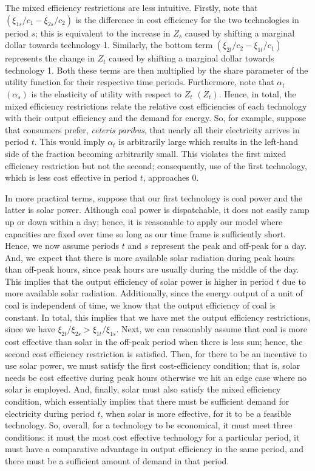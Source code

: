 \documentclass[11pt,a4paper,leqno]{extarticle}
\begin{document}
	The mixed efficiency restrictions are less intuitive. Firstly, note that $\left(\xi_{1s}/c_1 - \xi_{2s}/c_2\right)$ is the difference in cost efficiency for the two technologies in period $s$; this is equivalent to the increase in $Z_s$ caused by shifting a marginal dollar towards technology 1. Similarly, the bottom term $\left( \xi_{2t}/c_2 - \xi_{1t}/c_1 \right)$ represents the change in $Z_t$ caused by shifting a marginal dollar towards technology 1. Both these terms are then multiplied by the share parameter of the utility function for their respective time periods. Furthermore, note that $\alpha_t$ $(\alpha_s)$ is the elasticity of utility with respect to $Z_t$ $(Z_t)$. Hence, in total, the mixed efficiency restrictions relate the relative cost efficiencies of each technology with their output efficiency and the demand for energy. So, for example, suppose that consumers prefer, \textit{ceteris paribus}, that nearly all their electricity arrives in period $t$. This would imply $\alpha_t$ is arbitrarily large which results in the left-hand side of the fraction becoming arbitrarily small. This violates the first mixed efficiency restriction but not the second; consequently, use of the first technology, which is less cost effective in period $t$, approaches $0$. 
	
	
	
	In more practical terms, suppose that our first technology is coal power and the latter is solar power. Although coal power is dispatchable, it does not easily ramp up or down within a day; hence, it is reasonable to apply our model where capacities are fixed over time so long as our time frame is sufficiently short. Hence, we now assume periods $t$ and $s$ represent the peak and off-peak for a day. And, we expect that there is more available solar radiation during peak hours than off-peak hours, since peak hours are usually during the middle of the day. This implies that the output efficiency of solar power is higher in period $t$ due to more available solar radiation. Additionally, since the energy output of a unit of coal is independent of time, we know that the output efficiency of coal is constant. In total, this implies that we have met the output efficiency restrictions, since we have $\xi_{2t}/\xi_{2s} > \xi_{1t}/\xi_{1s}$. Next, we can reasonably assume that coal is more cost effective than solar in the off-peak period when there is less sun; hence, the second cost efficiency restriction is satisfied. Then, for there to be an incentive to use solar power, we must satisfy the first cost-efficiency condition; that is, solar needs be cost effective during peak hours otherwise we hit an edge case where no solar is employed. And, finally, solar must also satisfy the mixed efficiency condition, which essentially implies that there must be sufficient demand for electricity during period $t$, when solar is more effective, for it to be a feasible technology. So, overall, for a technology to be economical, it must meet three conditions: it must the most cost effective technology for a particular period, it must have a comparative advantage in output efficiency in the same period, and there must be a sufficient amount of demand in that period. 
	
\end{document}
